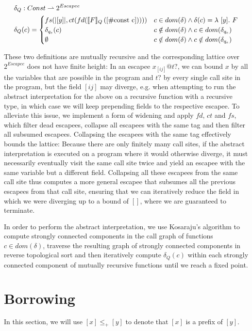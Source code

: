 \begin{align*}
	\delta_Q &: \mathrlap{Const \rightharpoonup 2^{Escapee}} \\
	\delta_Q&(c) = \begin{cases}
		fs(|[y]|, ct(fd(\ecp{F}{[\#\text{const c}]}))) & c \in dom(\delta) \land \delta(c) = \lambda\ [y].\ F \\
		\delta_{q_e}(c) & c \notin dom(\delta) \land c \in dom(\delta_{q_e}) \\
		\emptyset & c \notin dom(\delta) \land c \notin dom(\delta_{q_e})
	\end{cases}
\end{align*}

These two definitions are mutually recursive and the corresponding lattice over $2^{Escapee}$ does not have finite height: In an escapee $x_{[ij]} @ t?$, we can bound $x$ by all the variables that are possible in the program and $t?$ by every single call site in the program, but the field $[ij]$ may diverge, e.g. when attempting to run the abstract interpretation for the above on a recursive function with a recursive type, in which case we will keep prepending fields to the respective escapee. To alleviate this issue, we implement a form of widening and apply $fd$, $ct$ and $fs$, which filter dead escapees, collapse all escapees with the same tag and then filter all subsumed escapees. Collapsing the escapees with the same tag effectively bounds the lattice: Because there are only finitely many call sites, if the abstract interpretation is executed on a program where it would otherwise diverge, it must necessarily eventually visit the same call site twice and yield an escapee with the same variable but a different field. Collapsing all these escapees from the same call site thus computes a more general escapee that subsumes all the previous escapees from that call site, ensuring that we can iteratively reduce the field in which we were diverging up to a bound of $[]$, where we are guaranteed to terminate.

In order to perform the abstract interpretation, we use Kosaraju's algorithm to compute strongly connected components in the call graph of functions $c \in dom(\delta)$, traverse the resulting graph of strongly connected components in reverse topological sort and then iteratively compute $\delta_Q(c)$ within each strongly connected component of mutually recursive functions until we reach a fixed point.

\section{Borrowing}
In this section, we will use $[x] \leq_+ [y]$ to denote that $[x]$ is a prefix of $[y]$.

